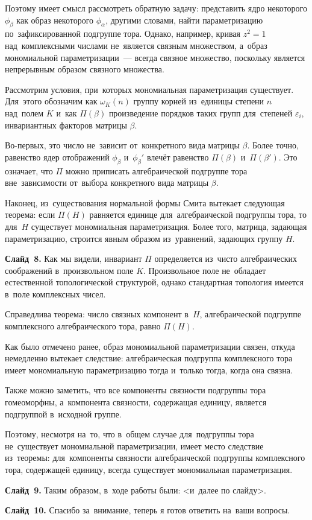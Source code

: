 \documentclass{article}
\begin{document}
  Поэтому имеет смысл рассмотреть обратную задачу: представить ядро некоторого $\phi_\beta$ как образ некоторого $\phi_\alpha$,
  другими словами, найти параметризацию по~зафиксированной подгруппе тора. Однако, например, кривая $z^2 = 1$ над~комплексными числами
  не~является связным множеством, а~образ мономиальной параметризации~— всегда связное множество, поскольку является непрерывным
  образом связного множества.

  Рассмотрим условия, при~которых мономиальная параметризация существует. Для~этого обозначим как $\omega_K(n)$ группу корней из~единицы
  степени $n$ над~полем $K$ и~как $\Pi(\beta)$ произведение порядков таких групп для~степеней $\varepsilon_i$, инвариантных факторов матрицы $\beta$.

  Во-первых, это число не~зависит от~конкретного вида матрицы $\beta$. Более точно, равенство ядер отображений $\phi_\beta$ и~$\phi_\beta'$
  влечёт равенство $\Pi(\beta)$ и~$\Pi(\beta')$. Это означает, что $\Pi$ можно приписать алгебраической подгруппе тора вне~зависимости
  от~выбора конкретного вида матрицы $\beta$.

  Наконец, из~существования нормальной формы Смита вытекает следующая теорема: если $\Pi(H)$ равняется единице для~алгебраической подгруппы
  тора, то для~$H$ существует мономиальная параметризация. Более того, матрица, задающая параметризацию, строится явным образом из~уравнений,
  задающих группу $H$.

  \textbf{Слайд~8.} Как мы видели, инвариант $\Pi$ определяется из~чисто алгебраических соображений в~произвольном поле $K$.
  Произвольное поле не~обладает естественной топологической структурой, однако стандартная топология имеется в~поле комплексных чисел.

  Справедлива теорема: число связных компонент в~$H$, алгебраической подгруппе комплексного алгебраического тора, равно $\Pi(H)$.

  Как было отмечено ранее, образ мономиальной параметризации связен, откуда немедленно вытекает следствие:
  алгебраическая подгруппа комплексного тора имеет мономиальную параметризацию тогда и~только тогда,
  когда она связна.

  Также можно заметить, что все компоненты связности подгруппы тора гомеоморфны, а~компонента связности,
  содержащая единицу, является подгруппой в~исходной группе.

  Поэтому, несмотря на~то, что в~общем случае для~подгруппы тора не~существует мономиальной параметризации,
  имеет место следствие из~теоремы: для~компоненты связности алгебраической подгруппы комплексного тора, содержащей
  единицу, всегда существует мономиальная параметризация.

  \textbf{Слайд~9.} Таким образом, в~ходе работы были: <и~далее по слайду>.

  \textbf{Слайд~10.} Спасибо за~внимание, теперь я готов ответить на~ваши вопросы.
\end{document}
